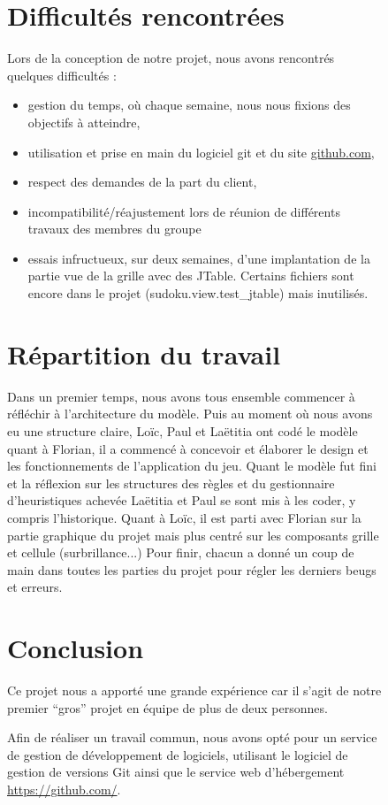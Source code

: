 \begin{figure}[ht]
\newpage
\section{Difficultés rencontrées}
Lors de la conception de notre projet, nous avons rencontrés quelques difficultés :
\begin{itemize}
 \item gestion du temps, où chaque semaine, nous nous fixions des objectifs à atteindre,
 \item utilisation et prise en main du logiciel git et du site 
	    \href{https://github.com/yuki1996/Sudoku}{github.com}, 
 \item respect des demandes de la part du client, 
 \item incompatibilité/réajustement lors de réunion de différents travaux des membres du groupe
 \item essais infructueux, sur deux semaines, d'une implantation de la partie vue
    de la grille avec des JTable. Certains fichiers sont encore dans le projet (sudoku.view.test\_jtable)
    mais inutilisés.
\end{itemize}
\section{Répartition du travail}
Dans un premier temps, nous avons tous ensemble commencer à réfléchir à l'architecture du modèle.
Puis au moment où nous avons eu une structure claire, Loïc, Paul et Laëtitia ont codé le modèle quant
à Florian, il a commencé à concevoir et élaborer le design et les fonctionnements de l'application du jeu.
Quant le modèle fut fini et la réflexion sur les structures des règles et du gestionnaire d'heuristiques
achevée Laëtitia et Paul se sont mis à les coder, y compris l'historique. Quant à Loïc, il est parti avec 
Florian sur la partie graphique du projet mais plus centré sur les composants grille et cellule (surbrillance...)
Pour finir, chacun a donné un coup de main dans toutes les parties du projet pour régler les derniers beugs et erreurs.

\newpage
\section{Conclusion}
Ce projet nous a apporté une grande expérience car il s'agit 
de notre premier ``gros'' projet en équipe de plus de deux personnes.

Afin de réaliser un travail commun, nous avons opté pour un service 
de gestion de développement de logiciels, utilisant le logiciel 
de gestion de versions Git ainsi que le service web d'hébergement \url{https://github.com/}.


\end{figure}
